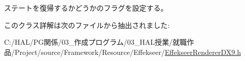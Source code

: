 ステートを復帰するかどうかのフラグを設定する。 



このクラス詳解は次のファイルから抽出されました\+:\begin{DoxyCompactItemize}
\item 
C\+:/\+H\+A\+L/\+P\+G関係/03\+\_\+作成プログラム/03\+\_\+\+H\+A\+L授業/就職作品/\+Project/source/\+Framework/\+Resource/\+Effekseer/\mbox{\hyperlink{_effekseer_renderer_d_x9_8h}{Effekseer\+Renderer\+D\+X9.\+h}}\end{DoxyCompactItemize}
